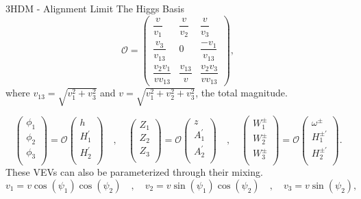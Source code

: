 \documentclass[10pt,xcolor=dvipsnames,mathserif]{beamer}
\begin{document}
\begin{frame}{3HDM - Alignment Limit }{The Higgs Basis}
\begin{equation*}
\mathcal{O} = 
\begin{pmatrix}
\dfrac{v}{v_1} & \dfrac{v}{v_2}  & \dfrac{v}{v_3} \\[1.2em]
\dfrac{v_3}{v_{13}} & 0 & \dfrac{-v_1}{v_{13}} \\[1.2em]
\dfrac{v_2 v_1}{v v_{13}}  & \dfrac{v_{13}}{v} & \dfrac{v_2 v_3}{v v_{13}}  
\end{pmatrix} , 
\end{equation*}
%
where $v_{13}=\sqrt{v_1^2 + v_3^2}$ and $v=\sqrt{v_1^2 + v_2^2 + v_3^2 }$, the total magnitude.

\begin{equation*}
\begin{pmatrix}
\phi_1 \\
\phi_2 \\
\phi_3 \\
\end{pmatrix} = 
\mathcal{O} \begin{pmatrix}
h \\
H_1^\prime \\
H_2^\prime \\
\end{pmatrix} 
%
\quad , \quad 
%
\begin{pmatrix}
Z_1 \\
Z_2 \\
Z_3 \\
\end{pmatrix} = 
\mathcal{O} \begin{pmatrix}
z \\
A_1^\prime  \\
A_2^\prime  \\
\end{pmatrix} 
%
\quad , \quad 
%
\begin{pmatrix}
W_1^\pm  \\
W_2^\pm  \\
W_3^\pm  \\
\end{pmatrix} = 
\mathcal{O} \begin{pmatrix}
\omega^\pm \\
H_1^{\pm \prime}  \\
H_2^{\pm \prime}  \\
\end{pmatrix} . 
\end{equation*}
%
These VEVs can also be parameterized through their mixing. 
\begin{equation*}
v_1 = v \cos(\psi_1) \cos(\psi_2) \quad , \quad v_2 = v \sin(\psi_1) \cos(\psi_2) \quad , \quad v_3 = v \sin(\psi_2) , 
\end{equation*}
\end{frame}
\end{document}
